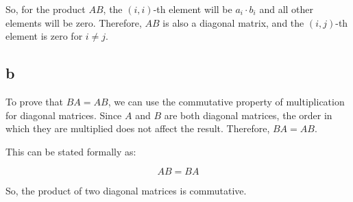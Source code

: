 So, for the product $AB$, the $(i, i)$-th element will be $a_i \cdot b_i$ and all other elements will be zero. Therefore, $AB$ is also a diagonal matrix, and the $(i, j)$-th element is zero for $i \neq j$.
\subsection{b}
To prove that $BA = AB$, we can use the commutative property of multiplication for diagonal matrices. Since $A$ and $B$ are both diagonal matrices, the order in which they are multiplied does not affect the result. Therefore, $BA = AB$.

This can be stated formally as:

\[
AB = BA
\]

So, the product of two diagonal matrices is commutative.
